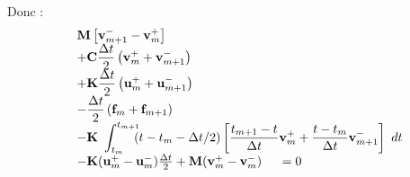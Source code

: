 \documentclass[12pt,a4paper]{report}
\begin{document}
Donc :
\begin{equation}
\begin{array}{r l}
	&\displaystyle
	 \mathbf{M} 
	    	\left[ \mathbf{v}_{m+1}^- 
	    		- \mathbf{v}_m^+ \right] 
	\\ 
	  &\displaystyle
	  +\mathbf{C} \frac{\Delta t}{2}
		\left(
			\mathbf{v}_m^+ + 
			\mathbf{v}_{m+1}^- 
		\right) 
	\\
	  &\displaystyle
	 +\mathbf{K} \frac{\Delta t}{2}
		\left(
			\mathbf{u}_m^+ + 
			\mathbf{u}_{m+1}^- 
		\right) 
	\\
	  &\displaystyle
	   -\frac{\Delta t}{2}
		\left(
			\mathbf{f}_m + 
			\mathbf{f}_{m+1}
		\right) 
	\\
	  &\displaystyle	    
	    -\mathbf{K}~\int_{t_m}^{t_{m+1}} \!\!\! 	
		(t-t_m-\Delta t/2) \left[
			\frac{t_{m+1}-t}{\Delta t} \mathbf{v}_m^+ + 
			\frac{t-t_m}{\Delta t} \mathbf{v}_{m+1}^- 
			\right] ~dt
	\\
	  &- \mathbf{K} (\mathbf{u}_m^+ - \mathbf{u}_m^-) \frac{\Delta t}{2}
	   + \mathbf{M} (\mathbf{v}_m^+ - \mathbf{v}_m^-) 
	~~~~=0	
\end{array}
\end{equation}
\end{document}
